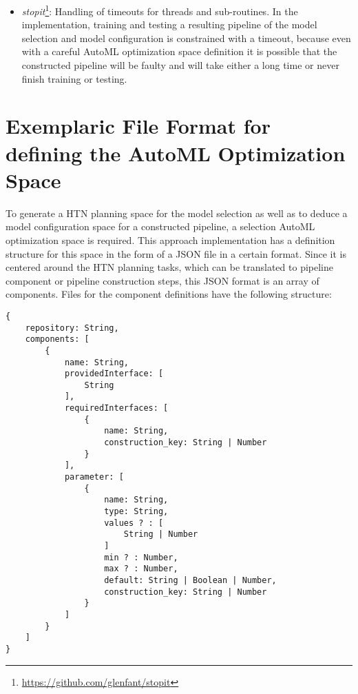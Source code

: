 \begin{itemize}
    \item \textit{stopit}\footnote{\url{https://github.com/glenfant/stopit}}: Handling of timeouts for threads and sub-routines.
    In the implementation, training and testing a resulting pipeline of the model selection and model configuration is constrained with a timeout, because even with a careful AutoML optimization space definition it is possible that the constructed pipeline will be faulty and will take either a long time or never finish training or testing.
\end{itemize}

\section{Exemplaric File Format for defining the AutoML Optimization Space}
\label{sec:implementation:json}
To generate a HTN planning space for the model selection as well as to deduce a model configuration space for a constructed pipeline, a selection AutoML optimization space is required.
This approach implementation has a definition structure for this space in the form of a JSON file in a certain format.\newline
Since it is centered around the HTN planning tasks, which can be translated to pipeline component or pipeline construction steps, this JSON format is an array of components.
Files for the component definitions have the following structure:
\begin{verbatim}
{
    repository: String,
    components: [
        {
            name: String,
            providedInterface: [
                String
            ],
            requiredInterfaces: [
                {
                    name: String,
                    construction_key: String | Number
                }
            ],
            parameter: [
                {
                    name: String,
                    type: String,
                    values ? : [
                        String | Number
                    ]
                    min ? : Number,
                    max ? : Number,
                    default: String | Boolean | Number,
                    construction_key: String | Number
                }
            ]
        }
    ]
}
\end{verbatim}

